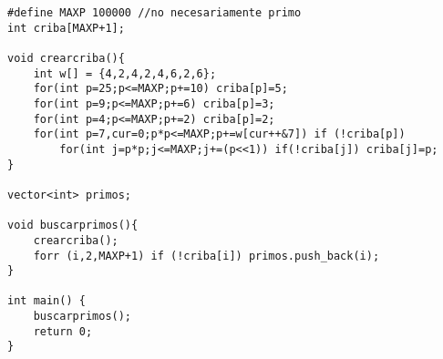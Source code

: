 \begin{verbatim}
#define MAXP 100000	//no necesariamente primo
int criba[MAXP+1];

void crearcriba(){
	int w[] = {4,2,4,2,4,6,2,6};
	for(int p=25;p<=MAXP;p+=10) criba[p]=5;
	for(int p=9;p<=MAXP;p+=6) criba[p]=3; 
	for(int p=4;p<=MAXP;p+=2) criba[p]=2;
	for(int p=7,cur=0;p*p<=MAXP;p+=w[cur++&7]) if (!criba[p]) 
		for(int j=p*p;j<=MAXP;j+=(p<<1)) if(!criba[j]) criba[j]=p;
}

vector<int> primos;

void buscarprimos(){
	crearcriba();
	forr (i,2,MAXP+1) if (!criba[i]) primos.push_back(i);
}

int main() {
	buscarprimos();
	return 0;
}
\end{verbatim}
